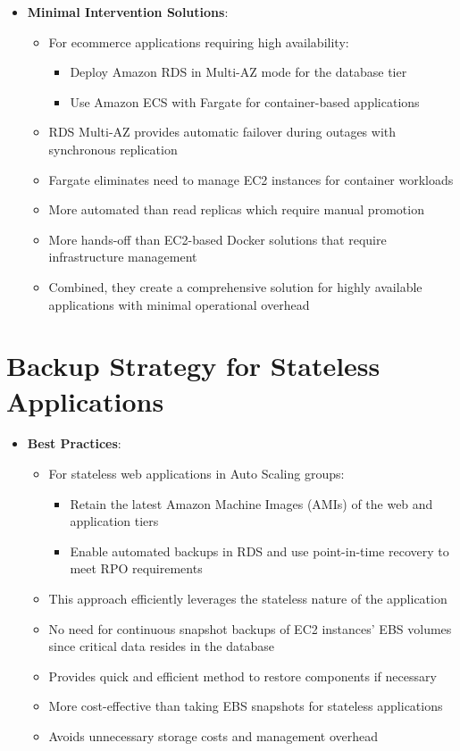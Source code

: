 \documentclass[11pt,a4paper]{report}
\begin{document}
\begin{itemize}
\begin{itemize}
\end{itemize}
  \item \textbf{Minimal Intervention Solutions}:
\begin{itemize}
  \item For ecommerce applications requiring high availability:
\begin{itemize}
  \item Deploy Amazon RDS in Multi-AZ mode for the database tier
  \item Use Amazon ECS with Fargate for container-based applications
\end{itemize}
  \item RDS Multi-AZ provides automatic failover during outages with synchronous replication
  \item Fargate eliminates need to manage EC2 instances for container workloads
  \item More automated than read replicas which require manual promotion
  \item More hands-off than EC2-based Docker solutions that require infrastructure management
  \item Combined, they create a comprehensive solution for highly available applications with minimal operational overhead
\end{itemize}
\end{itemize}


\section{Backup Strategy for Stateless Applications}

\begin{itemize}
  \item \textbf{Best Practices}:
\begin{itemize}
  \item For stateless web applications in Auto Scaling groups:
\begin{itemize}
  \item Retain the latest Amazon Machine Images (AMIs) of the web and application tiers
  \item Enable automated backups in RDS and use point-in-time recovery to meet RPO requirements
\end{itemize}
  \item This approach efficiently leverages the stateless nature of the application
  \item No need for continuous snapshot backups of EC2 instances' EBS volumes since critical data resides in the database
  \item Provides quick and efficient method to restore components if necessary
  \item More cost-effective than taking EBS snapshots for stateless applications
  \item Avoids unnecessary storage costs and management overhead
\end{itemize}
\end{itemize}
\end{document}
